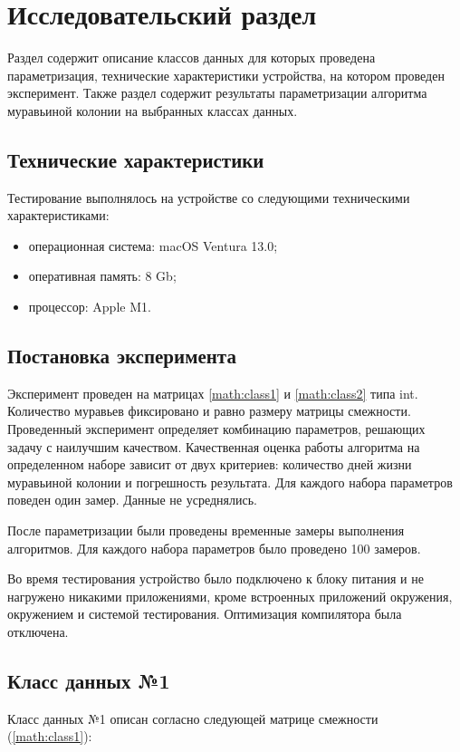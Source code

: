 \chapter{Исследовательский раздел}
\label{cha:research}
Раздел содержит описание классов данных для которых проведена параметризация, технические характеристики устройства, на котором проведен эксперимент. Также раздел содержит результаты параметризации алгоритма муравьиной колонии на выбранных классах данных.

\section{Технические характеристики}
Тестирование выполнялось на устройстве со следующими техническими характеристиками:
\begin{itemize}
        \item операционная система: macOS Ventura 13.0;
        \item оперативная память: 8 Gb;
        \item процессор: Apple M1.
\end{itemize}

\section{Постановка эксперимента}
Эксперимент проведен на матрицах \ref{math:class1} и \ref{math:class2} типа int. Количество муравьев фиксировано и равно размеру матрицы смежности. 
Проведенный эксперимент определяет комбинацию параметров, решающих задачу с наилучшим качеством. Качественная оценка работы алгоритма на определенном наборе зависит от двух критериев: количество дней жизни муравьиной колонии и погрешность результата. Для каждого набора параметров поведен один замер. Данные не усреднялись.

После параметризации были проведены временные замеры выполнения алгоритмов. Для каждого набора параметров было проведено 100 замеров.

Во время тестирования устройство было подключено к блоку питания и не нагружено никакими приложениями, кроме встроенных приложений окружения, окружением и системой тестирования. Оптимизация компилятора была отключена.

\section{Класс данных №1}

Класс данных №1 описан согласно следующей матрице смежности (\ref{math:class1}): 

